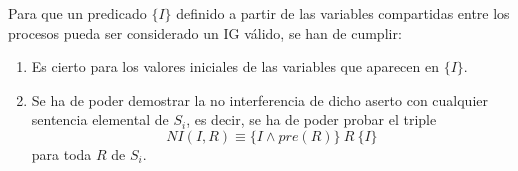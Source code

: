 Para que un predicado $\{I\}$ definido a partir de las variables compartidas entre los procesos pueda ser considerado un IG válido, se han de cumplir:
\begin{enumerate}
    \item Es cierto para los valores iniciales de las variables que aparecen en $\{I\}$.
    \item Se ha de poder demostrar la no interferencia de dicho aserto con cualquier sentencia elemental de $S_i$, es decir, se ha de poder probar el triple
        \begin{equation*}
            NI(I, R) \equiv \{I \land pre(R)\}\ R\ \{I\}
        \end{equation*}
        para toda $R$ de $S_i$.
\end{enumerate}
